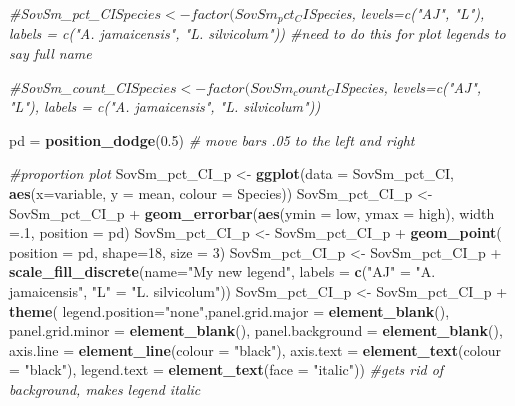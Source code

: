 \documentclass[]{article}
\newenvironment{Shaded}{\begin{snugshade}}{\end{snugshade}}
\newcommand{\KeywordTok}[1]{\textcolor[rgb]{0.13,0.29,0.53}{\textbf{{#1}}}}
\newcommand{\DataTypeTok}[1]{\textcolor[rgb]{0.13,0.29,0.53}{{#1}}}
\newcommand{\DecValTok}[1]{\textcolor[rgb]{0.00,0.00,0.81}{{#1}}}
\newcommand{\FloatTok}[1]{\textcolor[rgb]{0.00,0.00,0.81}{{#1}}}
\newcommand{\StringTok}[1]{\textcolor[rgb]{0.31,0.60,0.02}{{#1}}}
\newcommand{\CommentTok}[1]{\textcolor[rgb]{0.56,0.35,0.01}{\textit{{#1}}}}
\newcommand{\NormalTok}[1]{{#1}}
\begin{document}
\begin{Shaded}
\begin{Highlighting}[]
\CommentTok{#SovSm_pct_CI$Species <- factor(SovSm_pct_CI$Species, levels=c("AJ", "L"), labels = c("A. jamaicensis", "L. silvicolum")) #need to do this for plot legends to say full name}

\CommentTok{#SovSm_count_CI$Species <- factor(SovSm_count_CI$Species, levels=c("AJ", "L"), labels = c("A. jamaicensis", "L. silvicolum"))}


\NormalTok{pd =}\StringTok{ }\KeywordTok{position_dodge}\NormalTok{(}\FloatTok{0.5}\NormalTok{) }\CommentTok{# move bars .05 to the left and right}

\CommentTok{#proportion plot}
\NormalTok{SovSm_pct_CI_p <-}\StringTok{ }\KeywordTok{ggplot}\NormalTok{(}\DataTypeTok{data =} \NormalTok{SovSm_pct_CI, }\KeywordTok{aes}\NormalTok{(}\DataTypeTok{x=}\NormalTok{variable, }\DataTypeTok{y =} \NormalTok{mean, }\DataTypeTok{colour =} \NormalTok{Species))}
\NormalTok{SovSm_pct_CI_p <-}\StringTok{ }\NormalTok{SovSm_pct_CI_p +}\StringTok{ }\KeywordTok{geom_errorbar}\NormalTok{(}\KeywordTok{aes}\NormalTok{(}\DataTypeTok{ymin =} \NormalTok{low, }\DataTypeTok{ymax =} \NormalTok{high), }\DataTypeTok{width =}\NormalTok{.}\DecValTok{1}\NormalTok{, }\DataTypeTok{position =} \NormalTok{pd)}
\NormalTok{SovSm_pct_CI_p <-}\StringTok{ }\NormalTok{SovSm_pct_CI_p +}\StringTok{ }\KeywordTok{geom_point}\NormalTok{( }\DataTypeTok{position =} \NormalTok{pd, }\DataTypeTok{shape=}\DecValTok{18}\NormalTok{, }\DataTypeTok{size =} \DecValTok{3}\NormalTok{)}
\NormalTok{SovSm_pct_CI_p <-}\StringTok{ }\NormalTok{SovSm_pct_CI_p +}\StringTok{ }\KeywordTok{scale_fill_discrete}\NormalTok{(}\DataTypeTok{name=}\StringTok{"My new legend"}\NormalTok{, }\DataTypeTok{labels =} \KeywordTok{c}\NormalTok{(}\StringTok{"AJ"} \NormalTok{=}\StringTok{ "A. jamaicensis"}\NormalTok{, }\StringTok{"L"} \NormalTok{=}\StringTok{ "L. silvicolum"}\NormalTok{)) }
\NormalTok{SovSm_pct_CI_p <-}\StringTok{ }\NormalTok{SovSm_pct_CI_p +}\StringTok{  }\KeywordTok{theme}\NormalTok{( }\DataTypeTok{legend.position=}\StringTok{"none"}\NormalTok{,}\DataTypeTok{panel.grid.major =} \KeywordTok{element_blank}\NormalTok{(), }\DataTypeTok{panel.grid.minor =} \KeywordTok{element_blank}\NormalTok{(),}
\DataTypeTok{panel.background =} \KeywordTok{element_blank}\NormalTok{(), }\DataTypeTok{axis.line =} \KeywordTok{element_line}\NormalTok{(}\DataTypeTok{colour =} \StringTok{"black"}\NormalTok{), }\DataTypeTok{axis.text =} \KeywordTok{element_text}\NormalTok{(}\DataTypeTok{colour =} \StringTok{"black"}\NormalTok{), }\DataTypeTok{legend.text =} \KeywordTok{element_text}\NormalTok{(}\DataTypeTok{face =} \StringTok{"italic"}\NormalTok{))  }\CommentTok{#gets rid of background, makes legend italic}


\end{Highlighting}
\end{Shaded}
\end{document}
